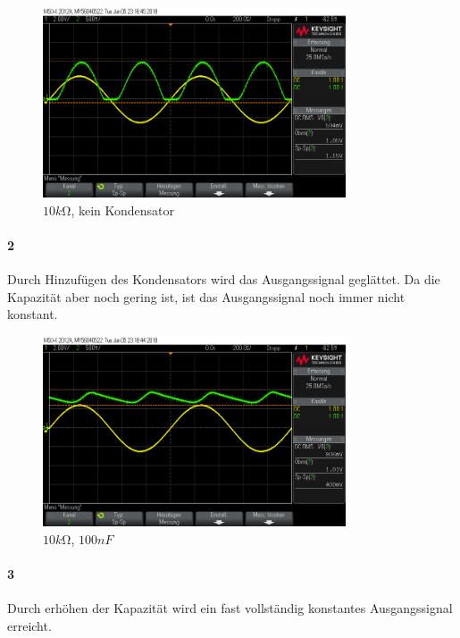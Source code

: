 \documentclass[a4paper]{article}
\begin{document}
\begin{figure}[H]
    \centering
    \includegraphics[width=0.8\textwidth]{versuch4/versuch4_1.png}
    \caption{$10\si{k\ohm}$, kein Kondensator}
    \label{fig:versuch4-1}
\end{figure}

\paragraph{2}

Durch Hinzufügen des Kondensators wird das Ausgangssignal geglättet. Da die Kapazität aber noch gering ist, ist das Ausgangssignal noch immer nicht konstant.

\begin{figure}[H]
    \centering
    \includegraphics[width=0.8\textwidth]{versuch4/versuch4_2.png}
    \caption{$10\si{k\ohm}$, $100\si{nF}$}
    \label{fig:versuch4-2}
\end{figure}

\paragraph{3}

Durch erhöhen der Kapazität wird ein fast vollständig konstantes Ausgangssignal erreicht.
\end{document}
